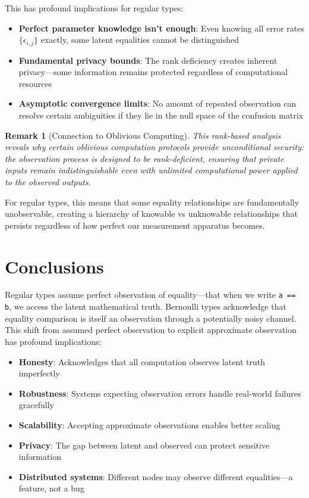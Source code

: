 \documentclass[11pt,final,hidelinks]{article}
\newtheorem{remark}[theorem]{Remark}
\newcommand{\code}[1]{\texttt{#1}}
\begin{document}
{This has profound implications for regular types:

\begin{itemize}
    \item \textbf{Perfect parameter knowledge isn't enough}: Even knowing all error rates $\{\epsilon_{i,j}\}$ exactly, some latent equalities cannot be distinguished
    \item \textbf{Fundamental privacy bounds}: The rank deficiency creates inherent privacy—some information remains protected regardless of computational resources
    \item \textbf{Asymptotic convergence limits}: No amount of repeated observation can resolve certain ambiguities if they lie in the null space of the confusion matrix
\end{itemize}

\begin{remark}[Connection to Oblivious Computing]
This rank-based analysis reveals why certain oblivious computation protocols provide unconditional security: the observation process is designed to be rank-deficient, ensuring that private inputs remain indistinguishable even with unlimited computational power applied to the observed outputs.
\end{remark}

For regular types, this means that some equality relationships are fundamentally unobservable, creating a hierarchy of knowable vs unknowable relationships that persists regardless of how perfect our measurement apparatus becomes.

\section{Conclusions}

Regular types assume perfect observation of equality—that when we write \code{a == b}, we access the latent mathematical truth. Bernoulli types acknowledge that equality comparison is itself an observation through a potentially noisy channel. This shift from assumed perfect observation to explicit approximate observation has profound implications:

\begin{itemize}
    \item \textbf{Honesty}: Acknowledges that all computation observes latent truth imperfectly
    \item \textbf{Robustness}: Systems expecting observation errors handle real-world failures gracefully
    \item \textbf{Scalability}: Accepting approximate observations enables better scaling
    \item \textbf{Privacy}: The gap between latent and observed can protect sensitive information
    \item \textbf{Distributed systems}: Different nodes may observe different equalities—a feature, not a bug
\end{itemize}

}
\end{document}
